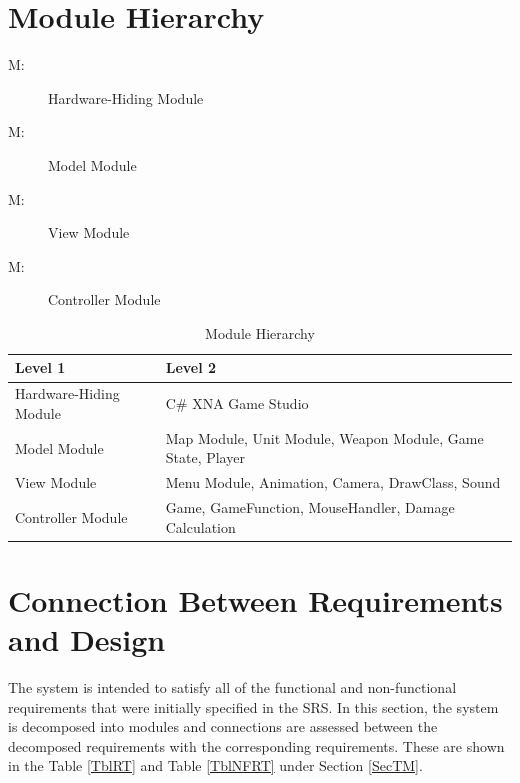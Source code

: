 \documentclass{article}
\newcounter{mnum}
\newcommand{\mthemnum}{M\themnum}
\begin{document}
\section{Module Hierarchy} \label{SecMH}

\begin{description}
    \item [ \mthemnum \label{HHm}:] Hardware-Hiding Module
    \item [ \mthemnum \label{Mm}:] Model Module
    \item [ \mthemnum \label{Vm}:] View Module
    \item [ \mthemnum \label{Cm}:] Controller Module
\end{description}

\begin{table}[H]
    \centering
    \begin{tabular}{p{} p{}}
        \toprule
        \textbf{Level 1} & \textbf{Level 2} \\
        \midrule
        Hardware-Hiding Module & C\# XNA Game Studio \\
        Model Module  & Map Module, Unit Module, Weapon Module, Game State, Player \\
        View Module & Menu Module, Animation, Camera, DrawClass, Sound \\
        Controller Module & Game, GameFunction, MouseHandler, Damage Calculation\\
        \bottomrule
    \end{tabular}
    \caption{Module Hierarchy}
    \label{TblMH}
\end{table}


\section{Connection Between Requirements and Design} \label{SecConnection}

The system is intended to satisfy all of the functional and non-functional requirements that were initially specified in the SRS. In this section, the system is decomposed into modules and connections are assessed between the decomposed requirements with the corresponding requirements. These are shown in the Table \ref{TblRT} and Table \ref{TblNFRT} under Section \ref{SecTM}. \\
\end{document}
